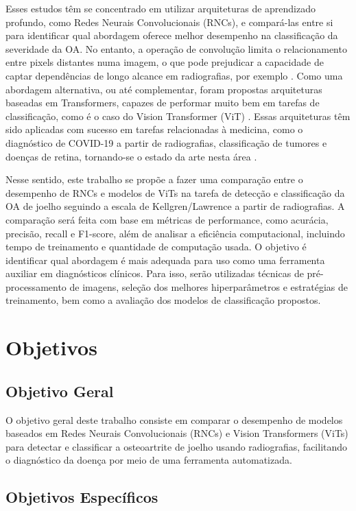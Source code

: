 Esses estudos têm se concentrado em utilizar arquiteturas de aprendizado profundo, como Redes Neurais Convolucionais (RNCs), e compará-las entre si para identificar qual abordagem oferece melhor desempenho na classificação da severidade da OA. No entanto, a operação de convolução limita o relacionamento entre pixels distantes numa imagem, o que pode prejudicar a capacidade de captar dependências de longo alcance em radiografias, por exemplo \cite{Shamshad2023}. Como uma abordagem alternativa, ou até complementar, foram propostas arquiteturas baseadas em Transformers, capazes de performar muito bem em tarefas de classificação, como é o caso do Vision Transformer (ViT) \cite{Dosovitskiy2021}. Essas arquiteturas têm sido aplicadas com sucesso em tarefas relacionadas à medicina, como o diagnóstico de COVID-19 a partir de radiografias, classificação de tumores e doenças de retina, tornando-se o estado da arte nesta área \cite{Shamshad2023}.

Nesse sentido, este trabalho se propõe a fazer uma comparação entre o desempenho de RNCs e modelos de ViTs na tarefa de detecção e classificação da OA de joelho seguindo a escala de Kellgren/Lawrence a partir de radiografias. A comparação será feita com base em métricas de performance, como acurácia, precisão, recall e F1-score, além de analisar a eficiência computacional, incluindo tempo de treinamento e quantidade de computação usada. O objetivo é identificar qual abordagem é mais adequada para uso como uma ferramenta auxiliar em diagnósticos clínicos. Para isso, serão utilizadas técnicas de pré-processamento de imagens, seleção dos melhores hiperparâmetros e estratégias de treinamento, bem como a avaliação dos modelos de classificação propostos.

\section{Objetivos}

\subsection{Objetivo Geral}

O objetivo geral deste trabalho consiste em comparar o desempenho de modelos baseados em Redes Neurais Convolucionais (RNCs) e Vision Transformers (ViTs) para detectar e classificar a osteoartrite de joelho usando radiografias, facilitando o diagnóstico da doença por meio de uma ferramenta automatizada.

\subsection{Objetivos Específicos}

